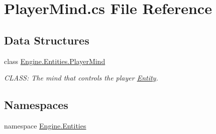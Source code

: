 \hypertarget{a00026}{}\section{Player\+Mind.\+cs File Reference}
\label{a00026}
\subsection*{Data Structures}
\begin{DoxyCompactItemize}
\item 
class \hyperlink{a00326}{Engine.\+Entities.\+Player\+Mind}
\begin{DoxyCompactList}\small\item\em C\+L\+A\+SS\+: The mind that controls the player \hyperlink{a00314}{Entity}. \end{DoxyCompactList}\end{DoxyCompactItemize}
\subsection*{Namespaces}
\begin{DoxyCompactItemize}
\item 
namespace \hyperlink{a00242}{Engine.\+Entities}
\end{DoxyCompactItemize}
